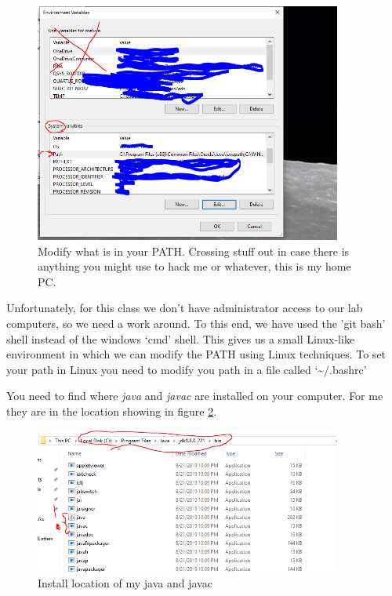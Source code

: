 \documentclass[12pt]{article}
\begin{document}
\begin{figure}[h]
  \centering
    \includegraphics[width=0.9\textwidth]{Images/path0.PNG}
  \caption{Modify what is in your PATH. Crossing stuff out in case there is
anything you might use to hack me or whatever, this is my home PC.}
	\label{pathwindows}
\end{figure}

Unfortunately, for this class we don't have administrator access to our lab
computers, so we need a work around. To this end, we have used the 'git bash'
shell instead of the windows `cmd' shell. This gives us a small Linux-like
environment in which we can modify the PATH using Linux techniques. To set your
path in Linux you need to modify you path in a file called `\~{}/.bashrc'

You need to find where \textit{java} and \textit{javac} are installed on your
computer. For me they are in the location showing in figure
\ref{myjavalocation}.

\begin{figure}[h]
  \centering
    \includegraphics[width=0.9\textwidth]{Images/javaPrograms.PNG}
  \caption{ Install location of my java and javac}
	\label{myjavalocation}
\end{figure}
\end{document}
